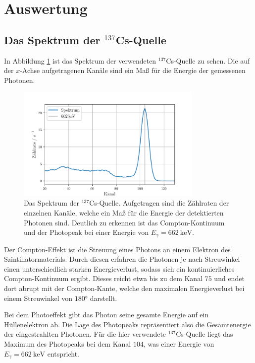 \newpage
\section{Auswertung}
\label{sec:Auswertung}

\subsection{Das Spektrum der $^{137}$Cs-Quelle}
In Abbildung \ref{fig:tfig1} ist das Spektrum der verwendeten $^{137}$Cs-Quelle zu sehen.
Die auf der $x$-Achse aufgetragenen Kanäle sind ein Maß für die Energie der gemessenen Photonen.

\begin{figure}
\centering
\includegraphics[width=0.8\textwidth]{figures/Spektrum}
\caption{Das Spektrum der $^{137}$Cs-Quelle. Aufgetragen sind die Zählraten der einzelnen Kanäle, welche ein Maß für die Energie der detektierten Photonen sind.
Deutlich zu erkennen ist das Compton-Kontinuum und der Photopeak bei einer Energie von $E_\gamma = \SI{662}{\keV}$.}
\label{fig:tfig1}
\end{figure}

Der Compton-Effekt ist die Streuung eines Photons an einem Elektron des Szintillatormaterials.
Durch diesen erfahren die Photonen je nach Streuwinkel einen unterschiedlich starken Energieverlust, sodass sich ein kontinuierliches Compton-Kontinuum ergibt.
Dieses reicht etwa bis zu dem Kanal $75$ und endet dort abrupt mit der Compton-Kante, welche den maximalen Energieverlust bei einem Streuwinkel von $180°$ darstellt.

Bei dem Photoeffekt gibt das Photon seine gesamte Energie auf ein Hüllenelektron ab.
Die Lage des Photopeaks repräsentiert also die Gesamtenergie der eingestrahlten Photonen.
Für die hier verwendete $^{137}$Cs-Quelle liegt das Maximum des Photopeaks bei dem Kanal $104$, was einer Energie von $E_\gamma = \SI{662}{\keV}$ entspricht.

